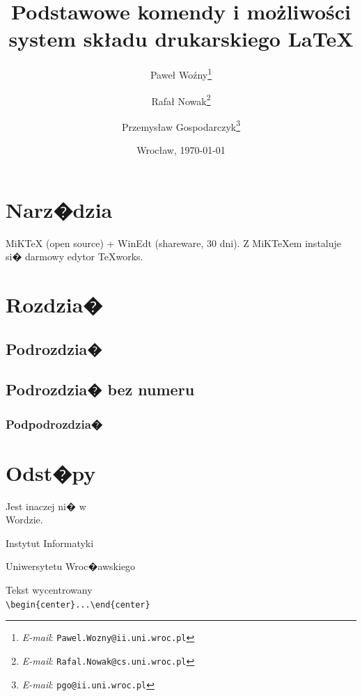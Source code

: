 \documentclass[11pt,wide]{mwart}
\date{Wrocław, \today}
\title{\LARGE\textbf{Podstawowe komendy i możliwości}\\system składu drukarskiego \LaTeX}
\author{Paweł Woźny\thanks{\textit{E-mail}: \texttt{Pawel.Wozny@ii.uni.wroc.pl}}%
	    \and
		Rafał Nowak\thanks{\textit{E-mail}: \texttt{Rafal.Nowak@cs.uni.wroc.pl}}
        \and
        Przemysław Gospodarczyk\thanks{\textit{E-mail}: \texttt{pgo@ii.uni.wroc.pl}}}
\begin{document}
\maketitle                %
\thispagestyle{empty}     %
\tableofcontents          %

\section{Narz�dzia}

\noindent MiKTeX (open source) + WinEdt (shareware, 30 dni). Z MiKTeXem instaluje si� darmowy edytor TeXworks.

\section{Rozdzia�}

\subsection{Podrozdzia�}
\subsection*{Podrozdzia� bez numeru}

\subsubsection{Podpodrozdzia�}


\section{Odst�py}
Jest          inaczej ni� w\\
Wordzie.\newline\newline


\noindent Instytut\hspace{4.75cm} Informatyki

\vspace{1cm}






\hspace{1cm} Uniwersytetu Wroc�awskiego



\begin{center}
Tekst wycentrowany\\
\verb+\begin{center}...\end{center}+
\end{center}
\end{document}
